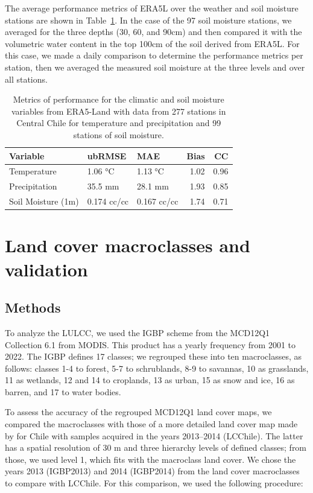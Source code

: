 \documentclass[
  authoryear,
  preprint,
  3p,
  onecolumn]{elsarticle}
\begin{document}
The average performance metrics of ERA5L over the weather and soil
moisture stations are shown in Table~\ref{tbl-metricsera5}. In the case
of the 97 soil moisture stations, we averaged for the three depths (30,
60, and 90cm) and then compared it with the volumetric water content in
the top 100cm of the soil derived from ERA5L. For this case, we made a
daily comparison to determine the performance metrics per station, then
we averaged the measured soil moisture at the three levels and over all
stations.

\begin{longtable}{lllrr}

\caption{\label{tbl-metricsera5}Metrics of performance for the climatic
and soil moisture variables from ERA5-Land with data from 277 stations
in Central Chile for temperature and precipitation and 99 stations of
soil moisture.}

\tabularnewline

\toprule
Variable & ubRMSE & MAE & Bias & CC \\ 
\midrule\addlinespace[2.5pt]
Temperature & 1.06 °C & 1.13 °C & 1.02 & 0.96 \\ 
Precipitation & 35.5 mm & 28.1 mm & 1.93 & 0.85 \\ 
Soil Moisture (1m) & 0.174 cc/cc & 0.167 cc/cc & 1.74 & 0.71 \\ 
\bottomrule

\end{longtable}

\section{Land cover macroclasses and
validation}\label{land-cover-macroclasses-and-validation}

\subsection{Methods}\label{methods-1}

To analyze the LULCC, we used the IGBP scheme from the MCD12Q1
Collection 6.1 from MODIS. This product has a yearly frequency from 2001
to 2022. The IGBP defines 17 classes; we regrouped these into ten
macroclasses, as follows: classes 1-4 to forest, 5-7 to schrublands, 8-9
to savannas, 10 as grasslands, 11 as wetlands, 12 and 14 to croplands,
13 as urban, 15 as snow and ice, 16 as barren, and 17 to water bodies.

To assess the accuracy of the regrouped MCD12Q1 land cover maps, we
compared the macroclasses with those of a more detailed land cover map
made by \citet{Zhao2016} for Chile with samples acquired in the years
2013--2014 (LCChile). The latter has a spatial resolution of 30 m and
three hierarchy levels of defined classes; from those, we used level 1,
which fits with the macroclass land cover. We chose the years 2013
(IGBP2013) and 2014 (IGBP2014) from the land cover macroclasses to
compare with LCChile. For this comparison, we used the following
procedure:
\end{document}

